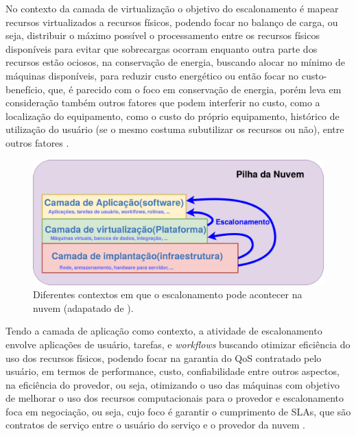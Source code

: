 No contexto da camada de virtualização o objetivo do escalonamento é mapear recursos virtualizados a recursos físicos, podendo focar no balanço de carga, ou seja, distribuir o máximo possível o processamento entre os recursos físicos disponíveis para evitar que sobrecargas ocorram enquanto outra parte dos recursos estão ociosos, na conservação de energia, buscando alocar no mínimo de máquinas disponíveis, para reduzir custo energético ou então focar no custo-benefício, que, é parecido com o foco em conservação de energia, porém leva em consideração também outros fatores que podem interferir no custo, como a localização do equipamento, como o custo do próprio equipamento, histórico de utilização do usuário (se o mesmo costuma subutilizar os recursos ou não), entre outros fatores \cite{Zhan:2015:CCR:2775083.2788397}.

\begin{figure}[htbp]
	\centerline{\includegraphics[width=15.0cm]{img/EscalonamentoStack.png}}
	\caption{Diferentes contextos em que o escalonamento pode acontecer na nuvem (adapatado de \cite{Zhan:2015:CCR:2775083.2788397}).}
	\label{EscalonamentoStack}
\end{figure}

Tendo a camada de aplicação como contexto, a atividade de escalonamento envolve aplicações de usuário, tarefas, e \textit{workflows} buscando otimizar eficiência do uso dos recursos físicos, podendo focar na garantia do \acrfull{QoS} contratado pelo usuário, em termos de performance, custo, confiabilidade entre outros aspectos, na eficiência do provedor, ou seja, otimizando o uso das máquinas com objetivo de melhorar o uso dos recursos computacionais para o provedor e escalonamento foca em negociação, ou seja, cujo foco é garantir o cumprimento de \acrfull{SLA}s, que são contratos de serviço entre o usuário do serviço e o provedor da nuvem \cite{Zhan:2015:CCR:2775083.2788397}.

